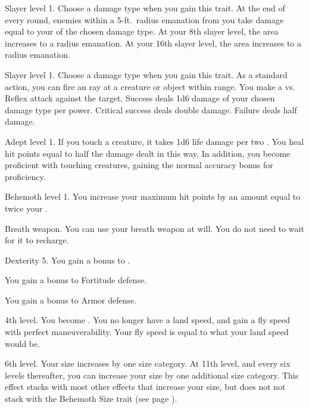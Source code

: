     \featpre Slayer level 1.
     Choose a damage type when you gain this trait.
    \featben At the end of every round, enemies within a 5-ft.\ radius emanation from you take damage equal to your  of the chosen damage type.
    At your 8th slayer level, the area increases to a \areasmall radius emanation.
    At your 16th slayer level, the area increases to a \areamed radius emanation.

    \featpre Slayer level 1.
     Choose a damage type when you gain this trait.
    \featben As a standard action, you can fire an ray at a creature or object within \rngclose range.
    You make a  vs. Reflex attack against the target.
    Success deals 1d6 damage of your chosen damage type per power.
    Critical success deals double damage.
    Failure deals half damage.

    \featpre Adept level 1.
    \featben If you touch a creature, it takes 1d6 life damage  per two .
    You heal hit points equal to half the damage dealt in this way.
    In addition, you become proficient with touching creatures, gaining the normal  accuracy bonus for proficiency.

    \featpre Behemoth level 1.
    \featben You increase your maximum hit points by an amount equal to twice your .

    \featpre Breath weapon.
    \featben You can use your breath weapon at will.
    You do not need to wait for it to recharge.

    \featpre Dexterity 5.
    \featben You gain a  bonus to .

    \featben You gain a  bonus to Fortitude defense.

    \featben You gain a  bonus to Armor defense.

    \featpre 4th level.
    \featben You become .
    You no longer have a land speed, and gain a fly speed with perfect maneuverability.
    Your fly speed is equal to what your land speed would be.

    \featpre 6th level.
    \featben Your size increases by one size category.
    At 11th level, and every six levels thereafter, you can increase your size by one additional size category.
    This effect stacks with most other effects that increase your size, but does not not stack with the Behemoth Size trait (see page ).

